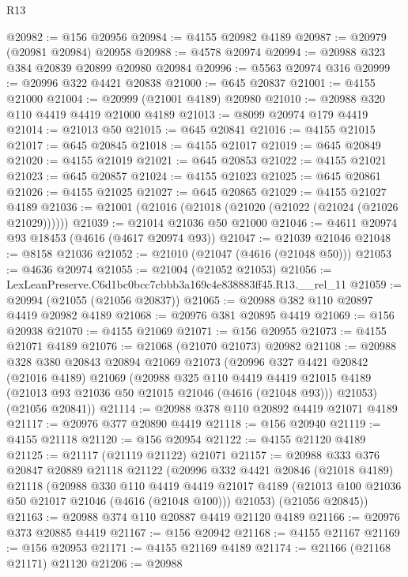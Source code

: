 \begin{lexlean}{R13}
\begin{coremodule}
@20982 := @156 @20956
@20984 := @4155 @20982 @4189
@20987 := @20979 (@20981 @20984) @20958
@20988 := @4578 @20974
@20994 := @20988 @323 @384 @20839 @20899 @20980 @20984
@20996 := @5563 @20974 @316
@20999 := @20996 @322 @4421 @20838
@21000 := @645 @20837
@21001 := @4155 @21000
@21004 := @20999 (@21001 @4189) @20980
@21010 := @20988 @320 @110 @4419 @4419 @21000 @4189
@21013 := @8099 @20974 @179 @4419
@21014 := @21013 @50
@21015 := @645 @20841
@21016 := @4155 @21015
@21017 := @645 @20845
@21018 := @4155 @21017
@21019 := @645 @20849
@21020 := @4155 @21019
@21021 := @645 @20853
@21022 := @4155 @21021
@21023 := @645 @20857
@21024 := @4155 @21023
@21025 := @645 @20861
@21026 := @4155 @21025
@21027 := @645 @20865
@21029 := @4155 @21027 @4189
@21036 := @21001 (@21016 (@21018 (@21020 (@21022 (@21024 (@21026 @21029))))))
@21039 := @21014 @21036 @50 @21000
@21046 := @4611 @20974 @93 @18453 (@4616 (@4617 @20974 @93))
@21047 := @21039 @21046
@21048 := @8158 @21036
@21052 := @21010 (@21047 (@4616 (@21048 @50)))
@21053 := @4636 @20974
@21055 := @21004 (@21052 @21053)
@21056 := LexLeanPreserve.C6d1bc0bcc7cbbb3a169c4e838883ff45.R13.__rel_11
@21059 := @20994 (@21055 (@21056 @20837))
@21065 := @20988 @382 @110 @20897 @4419 @20982 @4189
@21068 := @20976 @381 @20895 @4419
@21069 := @156 @20938
@21070 := @4155 @21069
@21071 := @156 @20955
@21073 := @4155 @21071 @4189
@21076 := @21068 (@21070 @21073) @20982
@21108 := @20988
    @328
    @380
    @20843
    @20894
    @21069
    @21073
    (@20996
      @327
      @4421
      @20842
      (@21016 @4189)
      @21069
      (@20988
        @325
        @110
        @4419
        @4419
        @21015
        @4189
        (@21013 @93 @21036 @50 @21015 @21046 (@4616 (@21048 @93)))
        @21053)
      (@21056 @20841))
@21114 := @20988 @378 @110 @20892 @4419 @21071 @4189
@21117 := @20976 @377 @20890 @4419
@21118 := @156 @20940
@21119 := @4155 @21118
@21120 := @156 @20954
@21122 := @4155 @21120 @4189
@21125 := @21117 (@21119 @21122) @21071
@21157 := @20988
    @333
    @376
    @20847
    @20889
    @21118
    @21122
    (@20996
      @332
      @4421
      @20846
      (@21018 @4189)
      @21118
      (@20988
        @330
        @110
        @4419
        @4419
        @21017
        @4189
        (@21013 @100 @21036 @50 @21017 @21046 (@4616 (@21048 @100)))
        @21053)
      (@21056 @20845))
@21163 := @20988 @374 @110 @20887 @4419 @21120 @4189
@21166 := @20976 @373 @20885 @4419
@21167 := @156 @20942
@21168 := @4155 @21167
@21169 := @156 @20953
@21171 := @4155 @21169 @4189
@21174 := @21166 (@21168 @21171) @21120
@21206 := @20988

\end{coremodule}
\end{lexlean}
